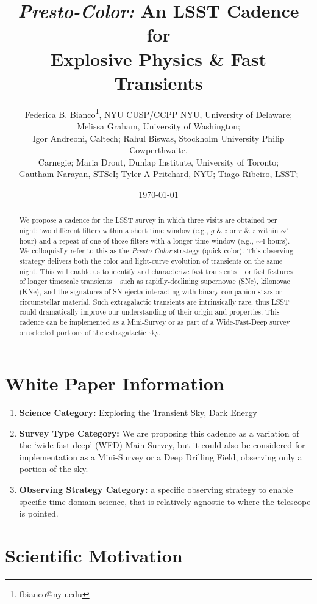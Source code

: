 \documentclass[12pt, letterpaper]{article}
\title{{\em Presto-Color:} An LSST Cadence for \\ Explosive Physics \& Fast Transients}
\author{\small{Federica B. Bianco\footnote{fbianco@nyu.edu}, NYU CUSP/CCPP NYU, University of Delaware;}\\\small{Melissa Graham, University of Washington;}\\\small{Igor Andreoni, Caltech; Rahul Biswas, Stockholm University Philip Cowperthwaite,}\\\small{Carnegie; Maria Drout, Dunlap Institute, University of Toronto;}\\\small{Gautham Narayan, STScI; Tyler A Pritchard, NYU; Tiago Ribeiro, LSST; 
}}
\date{\today}
\begin{document}
\maketitle

\begin{abstract}
We propose a cadence for the LSST survey in which three visits are obtained per night: two different filters within a short time window (e.g., $g$ \& $i$ or $r$ \& $z$ within $\sim1$ hour) and a repeat of one of those filters with a longer time window (e.g., $\sim4$ hours). We colloquially refer to this as the {\em Presto-Color} strategy (quick-color). This observing strategy delivers both the color and light-curve evolution of transients on the same night. This will enable us to identify and characterize fast transients -- or fast features of longer timescale transients -- such as rapidly-declining supernovae (SNe), kilonovae (KNe), and the signatures of SN ejecta interacting with binary companion stars or circumstellar material. Such extragalactic transients are intrinsically rare, thus LSST could dramatically improve our understanding of their origin and properties. This cadence can be implemented as a Mini-Survey or as part of a Wide-Fast-Deep survey on selected portions of the extragalactic sky.
\end{abstract}

\section{White Paper Information}
\begin{enumerate} 
\item {\bf Science Category:} Exploring the Transient Sky, Dark Energy
\item {\bf Survey Type Category:} 
We are proposing this cadence as a variation of the  `wide-fast-deep' (WFD) Main Survey, but it could also be considered for implementation as a Mini-Survey or a Deep Drilling Field, observing only a portion of the sky. 
\item {\bf Observing Strategy Category:} 
   a specific observing strategy to enable specific time domain science, that is relatively agnostic to where the telescope is pointed. 
\end{enumerate}  


\clearpage
\section{Scientific Motivation}
\end{document}
